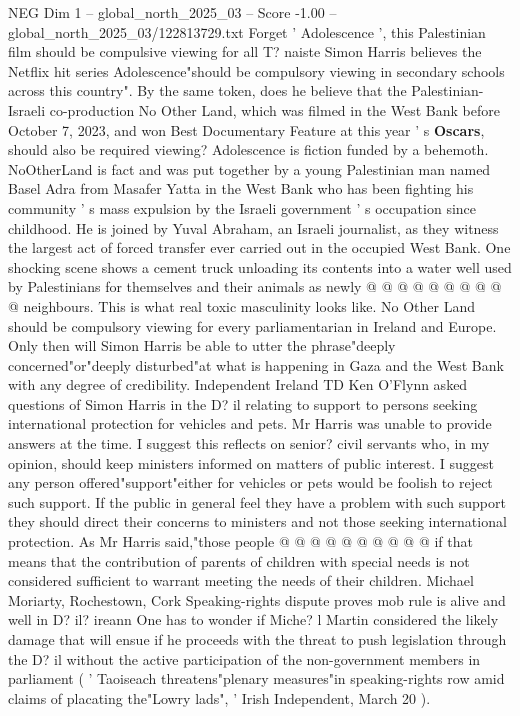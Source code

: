 \begin{textsample}{NEG Dim 1 – global\_north\_2025\_03 – Score -1.00 – global\_north\_2025\_03/122813729.txt}  \label{ex:f1_neg_029}
Forget ' Adolescence ', this Palestinian film should be compulsive viewing for all T? naiste Simon Harris believes the Netflix hit series Adolescence"should be compulsory viewing in secondary schools across this country".
By the same token, does he believe that the Palestinian-Israeli co-production No Other Land, which was filmed in the West Bank before October 7, 2023, and won Best Documentary Feature at this year ' s \textbf{Oscars}, should also be required viewing?
Adolescence is fiction funded by a behemoth.
NoOtherLand is fact and was put together by a young Palestinian man named Basel Adra from Masafer Yatta in the West Bank who has been fighting his community ' s mass expulsion by the Israeli government ' s occupation since childhood.
He is joined by Yuval Abraham, an Israeli journalist, as they witness the largest act of forced transfer ever carried out in the occupied West Bank.
One shocking scene shows a cement truck unloading its contents into a water well used by Palestinians for themselves and their animals as newly @ @ @ @ @ @ @ @ @ @ neighbours.
This is what real toxic masculinity looks like.
No Other Land should be compulsory viewing for every parliamentarian in Ireland and Europe.
Only then will Simon Harris be able to utter the phrase"deeply concerned"or"deeply disturbed"at what is happening in Gaza and the West Bank with any degree of credibility.
Independent Ireland TD Ken O'Flynn asked questions of Simon Harris in the D? il relating to support to persons seeking international protection for vehicles and pets.
Mr Harris was unable to provide answers at the time.
I suggest this reflects on senior? civil servants who, in my opinion, should keep ministers informed on matters of public interest.
I suggest any person offered"support"either for vehicles or pets would be foolish to reject such support.
If the public in general feel they have a problem with such support they should direct their concerns to ministers and not those seeking international protection.
As Mr Harris said,"those people @ @ @ @ @ @ @ @ @ @ if that means that the contribution of parents of children with special needs is not considered sufficient to warrant meeting the needs of their children.
Michael Moriarty, Rochestown, Cork Speaking-rights dispute proves mob rule is alive and well in D? il? ireann One has to wonder if Miche? l Martin considered the likely damage that will ensue if he proceeds with the threat to push legislation through the D? il without the active participation of the non-government members in parliament ( ' Taoiseach threatens"plenary measures"in speaking-rights row amid claims of placating the"Lowry lads", ' Irish Independent, March 20 ).

\end{textsample}
